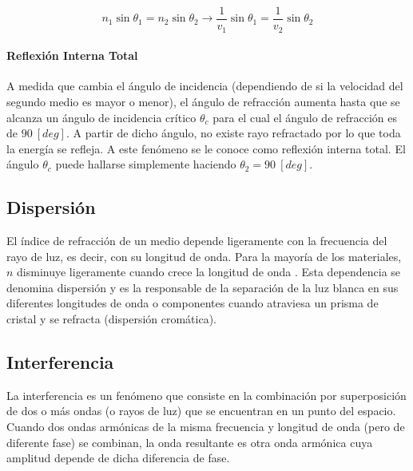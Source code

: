 \documentclass{tufte-handout}
\begin{document}
\begin{equation}
n_1 \sin{\theta_1} = n_2 \sin{\theta_2} \rightarrow \frac{1}{v_1}\sin{\theta_1} = \frac{1}{v_2}\sin{\theta_2}
\end{equation}

\paragraph{Reflexión Interna Total}

A medida que cambia el ángulo de incidencia (dependiendo de si la velocidad del segundo medio es mayor o menor), el ángulo de refracción aumenta hasta que se alcanza un ángulo de incidencia crítico $\theta_c$ para el cual el ángulo de refracción es de $90~[deg]$. A partir de dicho ángulo, no existe rayo refractado por lo que toda la energía se refleja. A este fenómeno se le conoce como reflexión interna total. El ángulo $\theta_c$ puede hallarse simplemente haciendo $\theta_2 = 90~[deg]$.

\subsection{Dispersión}

El índice de refracción de un medio depende ligeramente con la frecuencia del rayo de luz, es decir, con su longitud de onda. Para la mayoría de los materiales, $n$ disminuye ligeramente cuando crece la longitud de onda . Esta dependencia se denomina dispersión y es la responsable de la separación de la luz blanca en sus diferentes longitudes de onda o componentes cuando atraviesa un prisma de cristal y se refracta (dispersión cromática).


\subsection{Interferencia}

La interferencia es un fenómeno que consiste en la combinación por superposición de dos o más ondas (o rayos de luz) que se encuentran en un punto del espacio. Cuando dos ondas armónicas de la misma frecuencia y longitud de onda (pero de diferente fase) se combinan, la onda resultante es otra onda armónica cuya amplitud depende de dicha diferencia de fase.
\end{document}
